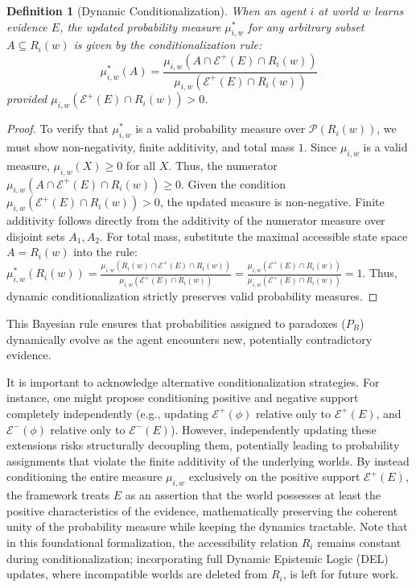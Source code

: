 \documentclass[11pt,a4paper]{article}
\newtheorem{definition}{Definition}[section]
\begin{document}
\begin{definition}[Dynamic Conditionalization]
When an agent $i$ at world $w$ learns evidence $E$, the updated probability measure $\mu_{i,w}^*$ for any arbitrary subset $A \subseteq R_i(w)$ is given by the conditionalization rule:
\begin{equation}
    \mu_{i,w}^*(A) = \frac{\mu_{i,w}(A \cap \mathcal{E}^+(E) \cap R_i(w))}{\mu_{i,w}(\mathcal{E}^+(E) \cap R_i(w))}
    \label{eq:cond}
\end{equation}
provided $\mu_{i,w}(\mathcal{E}^+(E) \cap R_i(w)) > 0$. 
\end{definition}
\begin{proof}
To verify that $\mu_{i,w}^*$ is a valid probability measure over $\mathcal{P}(R_i(w))$, we must show non-negativity, finite additivity, and total mass $1$. Since $\mu_{i,w}$ is a valid measure, $\mu_{i,w}(X) \ge 0$ for all $X$. Thus, the numerator $\mu_{i,w}(A \cap \mathcal{E}^+(E) \cap R_i(w)) \ge 0$. Given the condition $\mu_{i,w}(\mathcal{E}^+(E) \cap R_i(w)) > 0$, the updated measure is non-negative. Finite additivity follows directly from the additivity of the numerator measure over disjoint sets $A_1, A_2$. 
For total mass, substitute the maximal accessible state space $A = R_i(w)$ into the rule:
$\mu_{i,w}^*(R_i(w)) = \frac{\mu_{i,w}(R_i(w) \cap \mathcal{E}^+(E) \cap R_i(w))}{\mu_{i,w}(\mathcal{E}^+(E) \cap R_i(w))} = \frac{\mu_{i,w}(\mathcal{E}^+(E) \cap R_i(w))}{\mu_{i,w}(\mathcal{E}^+(E) \cap R_i(w))} = 1$. 
Thus, dynamic conditionalization strictly preserves valid probability measures.
\end{proof}

This Bayesian rule ensures that probabilities assigned to paradoxes ($P_B$) dynamically evolve as the agent encounters new, potentially contradictory evidence. 

It is important to acknowledge alternative conditionalization strategies. For instance, one might propose conditioning positive and negative support completely independently (e.g., updating $\mathcal{E}^+(\phi)$ relative only to $\mathcal{E}^+(E)$, and $\mathcal{E}^-(\phi)$ relative only to $\mathcal{E}^-(E)$). However, independently updating these extensions risks structurally decoupling them, potentially leading to probability assignments that violate the finite additivity of the underlying worlds. By instead conditioning the entire measure $\mu_{i,w}$ exclusively on the positive support $\mathcal{E}^+(E)$, the framework treats $E$ as an assertion that the world possesses at least the positive characteristics of the evidence, mathematically preserving the coherent unity of the probability measure while keeping the dynamics tractable. Note that in this foundational formalization, the accessibility relation $R_i$ remains constant during conditionalization; incorporating full Dynamic Epistemic Logic (DEL) \cite{baltag2008probabilistic} updates, where incompatible worlds are deleted from $R_i$, is left for future work.
\end{document}
